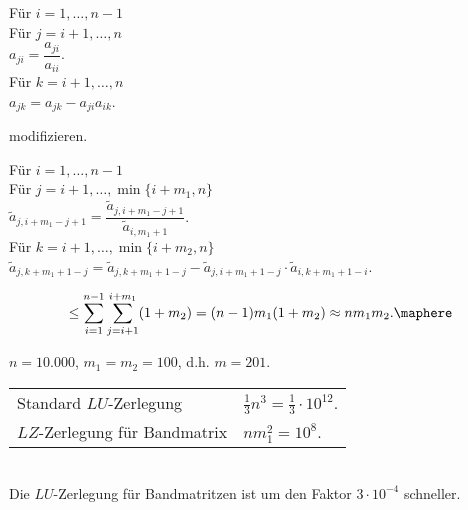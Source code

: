 \begin{tabbing}
\hspace{20pt}	Für $i=1,\ldots,n-1$\\
\hspace{40pt}		Für $j=i+1,\ldots,n$\\
\hspace{60pt}			$a_{ji} = \dfrac{a_{ji}}{a_{ii}}$.\\
\hspace{60pt}			Für $k=i+1,\ldots,n$\\
\hspace{80pt}				$a_{jk}=a_{jk}-a_{ji}a_{ik}$.
\end{tabbing}
			
modifizieren.

\begin{tabbing}
\hspace{20pt}	Für $i=1,\ldots,n-1$\\
\hspace{40pt}		Für $j=i+1,\ldots,\min\{i+m_1,n\}$\\
\hspace{60pt}			$\tilde{a}_{j,i+m_1-j+1} =
				\dfrac{\tilde{a}_{j,i+m_1-j+1}}{\tilde{a}_{i,m_1+1}}$.\\
\hspace{60pt}			Für $k=i+1,\ldots,\min\{i+m_2,n\}$\\
\hspace{80pt}			
$\tilde{a}_{j,k+m_1+1-j}=\tilde{a}_{j,k+m_1+1-j}-\tilde{a}_{j,i+m_1+1-j}\cdot
\tilde{a}_{i,k+m_1+1-i}$.
\end{tabbing}

\begin{bemn}
\begin{align*}
\le \sum\limits_{i=1}^{n-1}\sum\limits_{j=i+1}^{i+m_1} (1+m_2) =
(n-1)m_1(1+m_2)\approx n m_1 m_2.\maphere
\end{align*}
\end{bemn}

\begin{bspn}
$n=10.000$, $m_1=m_2 = 100$, d.h. $m=201$.\\
\begin{tabular}[h]{ll}
Standard $LU$-Zerlegung &  $\frac{1}{3}n^3 = \frac{1}{3}\cdot 10^{12}$.\\
$LZ$-Zerlegung für Bandmatrix & $nm_1^2 = 10^8$.
\end{tabular}\\
Die $LU$-Zerlegung für Bandmatritzen ist um den Faktor $3\cdot 10^{-4}$
schneller.\bsphere
\end{bspn}

